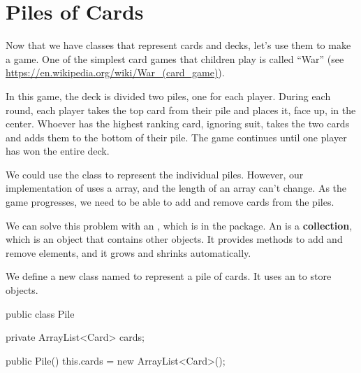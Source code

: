 \section{Piles of Cards}


Now that we have classes that represent cards and decks, let's use them to make a game.
One of the simplest card games that children play is called ``War'' (see \url{https://en.wikipedia.org/wiki/War_(card_game)}).

In this game, the deck is divided two piles, one for each player.
During each round, each player takes the top card from their pile and places it, face up, in the center.
Whoever has the highest ranking card, ignoring suit, takes the two cards and adds them to the bottom of their pile.
The game continues until one player has won the entire deck.

We could use the  class to represent the individual piles.
However, our implementation of  uses a  array, and the length of an array can't change.
As the game progresses, we need to be able to add and remove cards from the piles.


We can solve this problem with an , which is in the  package.
An  is a {\bf collection}, which is an object that contains other objects.
It provides methods to add and remove elements, and it grows and shrinks automatically.



We define a new class named  to represent a pile of cards.
It uses an  to store  objects.

\begin{code}
public class Pile {
    private ArrayList<Card> cards;

    public Pile() {
        this.cards = new ArrayList<Card>();
    }
}
\end{code}


